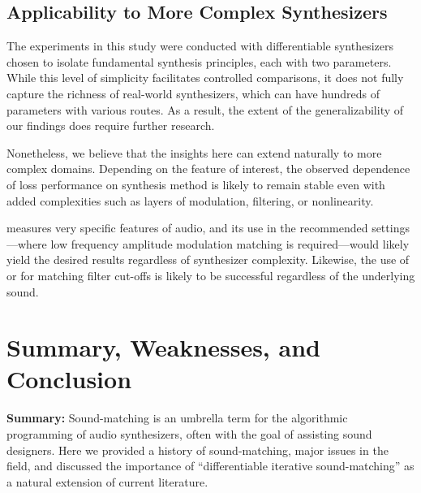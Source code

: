 \subsection{Applicability to More Complex Synthesizers}
The experiments in this study were conducted with differentiable synthesizers chosen to isolate fundamental synthesis principles, each with two parameters. While this level of simplicity facilitates controlled comparisons, it does not fully capture the richness of real-world synthesizers, which can have hundreds of parameters with various routes. As a result, the extent of the generalizability of our findings does require further research. 

Nonetheless, we believe that the insights here can extend naturally to more complex domains. Depending on the feature of interest, the observed dependence of loss performance on synthesis method is likely to remain stable even with added complexities such as layers of modulation, filtering, or nonlinearity. 

\DTWEnv{} measures very specific features of audio, and its use in the recommended settings---where low frequency amplitude modulation matching is required---would likely yield the desired results regardless of synthesizer complexity. Likewise, the use of \SIMSESpec{} or \LoneSpec{} for matching filter cut-offs is likely to be successful regardless of the underlying sound. 





\section{Summary, Weaknesses, and Conclusion}
\label{sec:summary_conclusion}
\textbf{Summary:} Sound-matching is an umbrella term for the algorithmic programming of audio synthesizers, often with the goal of assisting sound designers. Here we provided a history of sound-matching, major issues in the field, and discussed the importance of ``differentiable iterative sound-matching'' as a natural extension of current literature.

